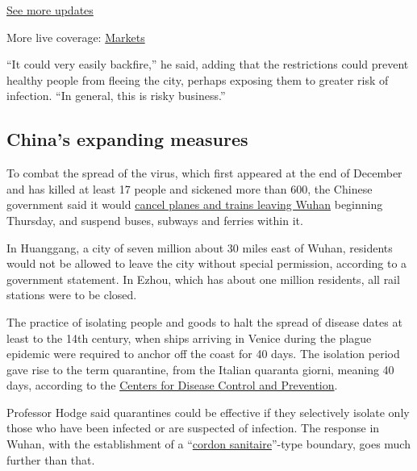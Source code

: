 \href{https://www.nytimes.com/2020/08/01/world/coronavirus-covid-19.html?action=click\&pgtype=Article\&state=default\&region=MAIN_CONTENT_1\&context=storylines_live_updates}{See
more updates}

More live coverage:
\href{https://www.nytimes.com/live/2020/07/31/business/stock-market-today-coronavirus?action=click\&pgtype=Article\&state=default\&region=MAIN_CONTENT_1\&context=storylines_live_updates}{Markets}

``It could very easily backfire,'' he said, adding that the restrictions
could prevent healthy people from fleeing the city, perhaps exposing
them to greater risk of infection. ``In general, this is risky
business.''

\hypertarget{chinas-expanding-measures}{%
\subsection{China's expanding
measures}\label{chinas-expanding-measures}}

To combat the spread of the virus, which first appeared at the end of
December and has killed at least 17 people and sickened more than 600,
the Chinese government said it would
\href{https://www.nytimes.com/2020/01/22/world/asia/china-coronavirus-travel.html}{cancel
planes and trains leaving Wuhan} beginning Thursday, and suspend buses,
subways and ferries within it.

In Huanggang, a city of seven million about 30 miles east of Wuhan,
residents would not be allowed to leave the city without special
permission, according to a government statement. In Ezhou, which has
about one million residents, all rail stations were to be closed.

The practice of isolating people and goods to halt the spread of disease
dates at least to the 14th century, when ships arriving in Venice during
the plague epidemic were required to anchor off the coast for 40 days.
The isolation period gave rise to the term quarantine, from the Italian
quaranta giorni, meaning 40 days, according to the
\href{https://www.cdc.gov/quarantine/historyquarantine.html}{Centers for
Disease Control and Prevention}.

Professor Hodge said quarantines could be effective if they selectively
isolate only those who have been infected or are suspected of infection.
The response in Wuhan, with the establishment of a
``\href{https://www.nytimes.com/2014/08/13/science/using-a-tactic-unseen-in-a-century-countries-cordon-off-ebola-racked-areas.html}{cordon
sanitaire}''-type boundary, goes much further than that.

